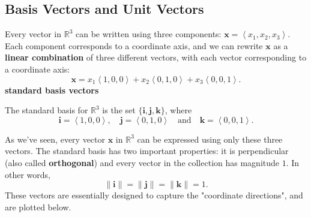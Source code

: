 \documentclass[10pt,]{book}
\newcommand{\terminology}[1]{\textbf{#1}}
\theoremstyle{ptxplainnotitle}
\theoremstyle{ptxplaintitle}
\theoremstyle{ptxplainnotitle}
\theoremstyle{ptxplaintitle}
\theoremstyle{ptxplainnotitle}
\theoremstyle{ptxplaintitle}
\theoremstyle{ptxdefinitionnotitle}
\theoremstyle{ptxdefinitiontitle}
\theoremstyle{ptxdefinitionnotitle}
\theoremstyle{ptxdefinitiontitle}
\theoremstyle{ptxdefinitionnotitle}
\theoremstyle{ptxdefinitiontitle}
\theoremstyle{ptxdefinitionnotitle}
\theoremstyle{ptxdefinitiontitle}
\theoremstyle{ptxdefinitionnotitle}
\theoremstyle{ptxdefinitiontitle}
\numberwithin{equation}{section}
\newcommand{\RR}{\mathbb{R}}
\newcommand{\vv}[1]{\mathbf{#1}}
\newcommand{\dotprod}[1]{\left\langle #1 \right\rangle}
\begin{document}
\subsection[{Basis Vectors and Unit Vectors}]{Basis Vectors and Unit Vectors}\label{subsection-basis-vectors-and-unit-vectors}
\hypertarget{p-764}{}%
Every vector in \(\RR^{3}\) can be written using three components: \(\vv{x} = \dotprod{x_{1},x_{2},x_{3}}.\) Each component corresponds to a coordinate axis, and we can rewrite \(\vv{x}\) as a \terminology{linear combination} of three different vectors, with each vector corresponding to a coordinate axis:%
%
\begin{equation*}
\vv{x} = x_{1}\dotprod{1,0,0}+x_{2}\dotprod{0,1,0}+x_{3}\dotprod{0,0,1}.
\end{equation*}
\terminology{standard basis vectors}\begin{definition}\label{definition-standard-basis-vectors}
\hypertarget{p-765}{}%
The standard basis for \(\RR^{3}\) is the set \(\{\vv{i},\vv{j},\vv{k}\}\), where%
%
\begin{equation*}
\vv{i} = \dotprod{1,0,0},\quad\vv{j} = \dotprod{0,1,0}\quad\text{and}\quad\vv{k} = \dotprod{0,0,1}.
\end{equation*}
\end{definition}
\hypertarget{p-766}{}%
As we've seen, every vector \(\vv{x}\) in \(\RR^{3}\) can be expressed using only these three vectors. The standard basis has two important properties: it is perpendicular (also called \terminology{orthogonal}) and every vector in the collection has magnitude \(1\). In other words,%
%
\begin{equation*}
\|\vv{i}\| = \|\vv{j}\| = \|\vv{k}\| = 1.
\end{equation*}
\hypertarget{p-767}{}%
These vectors are essentially designed to capture the "coordinate directions", and are plotted below.%
\end{document}
